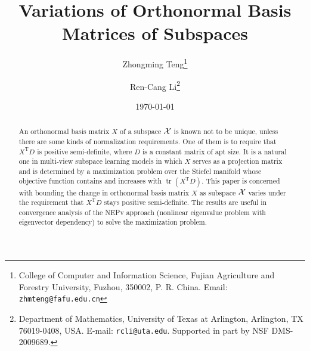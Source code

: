\documentclass[11pt]{article}
\title{Variations of Orthonormal Basis Matrices of Subspaces}
\author{Zhongming Teng\thanks{%
   College of Computer and Information Science, Fujian Agriculture and Forestry University, Fuzhou, 350002, P. R. China.
Email: {\tt zhmteng@fafu.edu.cn}}
\and  Ren-Cang Li\thanks{%
   Department of Mathematics, University of Texas at Arlington, Arlington, TX 76019-0408,
USA.  E-mail: {\tt rcli@uta.edu}.  Supported in part by NSF DMS-2009689.}
}
\date{\today}
\DeclareMathOperator{\tr}{tr}
\DeclareMathOperator{\T}{T}
\theoremstyle{definition}
\numberwithin{equation}{section}
\numberwithin{figure}{section}
\numberwithin{table}{section}
\begin{document}
\maketitle

\begin{abstract}
An orthonormal basis matrix $X$ of a subspace ${\cal X}$ is known not to be unique, unless there are some kinds of normalization requirements.
One of them is to require that $X^{\T}D$ is positive semi-definite, where $D$ is a
constant matrix of apt size. It is  a natural one in multi-view subspace learning
models in which $X$ serves as a projection matrix and is determined by
a maximization problem over the Stiefel manifold whose objective function contains
and increases with $\tr(X^{\T}D)$.
%
This paper is concerned with bounding the change in orthonormal basis matrix $X$ as subspace ${\cal X}$ varies
under the requirement that $X^{\T}D$ stays positive semi-definite.
The results are useful in
convergence analysis of the NEPv approach (nonlinear eigenvalue problem
with eigenvector dependency) to solve the maximization problem.
%
%
%
%

\end{abstract}
\end{document}
